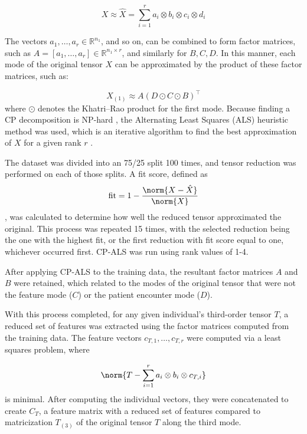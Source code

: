 \begin{equation*}
    X \approx \hat{X} = \sum^{r}_{i=1} a_i \otimes b_i \otimes c_i \otimes d_i
\end{equation*}

The vectors $a_1,\dots,a_r\in\mathbb{R}^{n_1}$, and so on, can be combined to form factor matrices, such as $A = [a_1, \dots, a_r]\in\mathbb{R}^{n_1\times r}$, and similarly for $B, C, D$. In this manner, each mode of the original tensor $X$ can be approximated by the product of these factor matrices, such as:

\begin{equation*}
    X_{(1)} \approx A \left( D \odot C \odot B \right)^{\top}
\end{equation*}
where $\odot$ denotes the Khatri--Rao product for the first mode. Because finding a CP decomposition is NP-hard \cite{hillar_most_2013}, the Alternating Least Squares (ALS) heuristic method was used, which is an iterative algorithm to find the best approximation of $X$ for a given rank $r$ \cite{kolda_tensors}.

The dataset was divided into an 75/25 split 100 times, and tensor reduction was performed on each of those splits. A fit score, defined as
\begin{equation*}
    \mathrm{fit} = 1 - \frac{\norm{X - \hat{X}}}{\norm{X}}
\end{equation*}
, was calculated to determine how well the reduced tensor approximated the original. This process was repeated 15 times, with the selected reduction being the one with the highest fit, or the first reduction with fit score equal to one, whichever occurred first. CP-ALS was run using rank values of 1-4.  

After applying CP-ALS to the training data, the resultant factor matrices $A$ and $B$ were retained, which related to the modes of the original tensor that were not the feature mode ($C$) or the patient encounter mode ($D$). 

With this process completed, for any given individual's third-order tensor $T$, a reduced set of features was extracted using the factor matrices computed from the training data. The feature vectors $c_{T,1}, \dots, c_{T,r}$ were computed via a least squares problem, where

\begin{equation*}
    \norm{T - \sum^{r}_{i=1} a_i \otimes b_i \otimes c_{T,i}}
\end{equation*}
is minimal. After computing the individual vectors, they were concatenated to create $C_T$, a feature matrix with a reduced set of features compared to matricization $T_{(3)}$ of the original tensor $T$ along the third mode.

